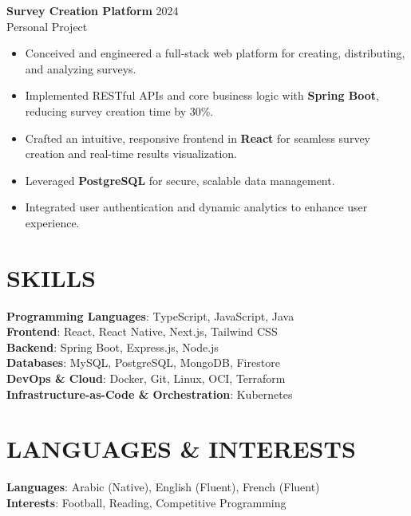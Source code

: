 \documentclass[10pt,a4paper]{article}
\begin{document}
	\textbf{Survey Creation Platform}
\hfill 2024 \\
Personal Project
\begin{itemize}[leftmargin=*]
    \item Conceived and engineered a full-stack web platform for creating, distributing, and analyzing surveys.
    \item Implemented RESTful APIs and core business logic with \textbf{Spring Boot}, reducing survey creation time by 30\%.
    \item Crafted an intuitive, responsive frontend in \textbf{React} for seamless survey creation and real-time results visualization.
    \item Leveraged \textbf{PostgreSQL} for secure, scalable data management.
    \item Integrated user authentication and dynamic analytics to enhance user experience.
\end{itemize}

\section{SKILLS}

	\textbf{Programming Languages}: TypeScript, JavaScript, Java \\
	\textbf{Frontend}: React, React Native, Next.js, Tailwind CSS \\
	\textbf{Backend}: Spring Boot, Express.js, Node.js \\
	\textbf{Databases}: MySQL, PostgreSQL, MongoDB, Firestore \\
	\textbf{DevOps \& Cloud}: Docker, Git, Linux, OCI, Terraform \\
	\textbf{Infrastructure-as-Code \& Orchestration}: Kubernetes

\section{LANGUAGES \& INTERESTS}

	\textbf{Languages}: Arabic (Native), English (Fluent), French (Fluent) \\
	\textbf{Interests}: Football, Reading, Competitive Programming
\end{document}
